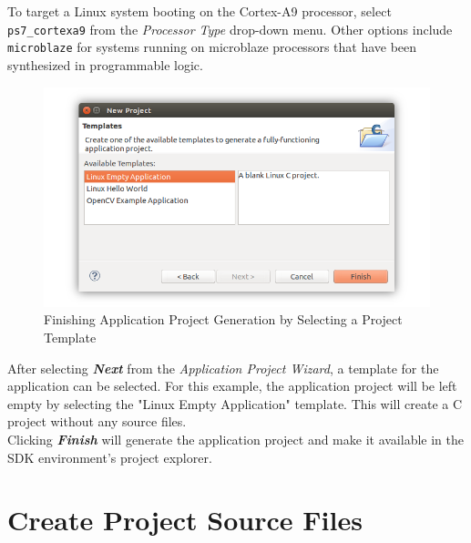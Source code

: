 \noindent
To target a Linux system booting on the Cortex-A9 processor, select \texttt{ps7\_cortexa9} from the \textit{Processor Type} drop-down menu. Other options include \texttt{microblaze} for systems running on microblaze processors that have been synthesized in programmable logic. \\


\begin{figure}[h!]
	\centering
	\includegraphics{images/Linux_Empty_Application.png}
	\caption{Finishing Application Project Generation by Selecting a Project Template}
\end{figure}

\noindent
After selecting \textit{\bfseries Next} from the \textit{Application Project Wizard}, a template for the application can be selected. For this example, the application project will be left empty by selecting the "Linux Empty Application" template. This will create a C project without any source files. \\



\noindent
Clicking \textit{\bfseries Finish} will generate the application project and make it available in the SDK environment's project explorer. 


\section{Create Project Source Files}


